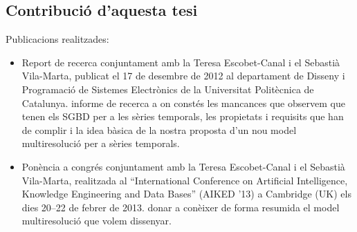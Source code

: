 





\subsection{Contribució d'aquesta tesi}




Publicacions realitzades:

\begin{itemize}

\item Report de recerca \parencite{llusa12:report} conjuntament amb
  la Teresa Escobet-Canal i el Sebastià Vila-Marta, publicat el 17 de
  desembre de 2012 al departament de Disseny i Programació de
  Sistemes Electrònics de la Universitat Politècnica de Catalunya.
 informe de
  recerca a on constés les mancances que observem que tenen els SGBD
  per a les sèries temporals, les propietats i requisits que han de
  complir i la idea bàsica de la nostra proposta d'un nou model
  multiresolució per a sèries temporals. 

\item Ponència a congrés \parencite{llusa13:aiked} conjuntament amb la
  Teresa Escobet-Canal i el Sebastià Vila-Marta, realitzada al
  ``International Conference on Artificial Intelligence, Knowledge
  Engineering and Data Bases'' (AIKED '13) a Cambridge (UK) els dies
  20--22 de febrer de 2013.
 donar a conèixer de
  forma resumida el model multiresolució que volem dissenyar.

\end{itemize}



